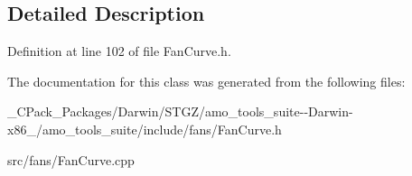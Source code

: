 \subsection{Detailed Description}


Definition at line 102 of file Fan\+Curve.\+h.



The documentation for this class was generated from the following files\+:\begin{DoxyCompactItemize}
\item 
\+\_\+\+C\+Pack\+\_\+\+Packages/\+Darwin/\+S\+T\+G\+Z/amo\+\_\+tools\+\_\+suite-\/-\/\+Darwin-\/x86\+\_/amo\+\_\+tools\+\_\+suite/include/fans/Fan\+Curve.\+h\item 
src/fans/Fan\+Curve.\+cpp\end{DoxyCompactItemize}
